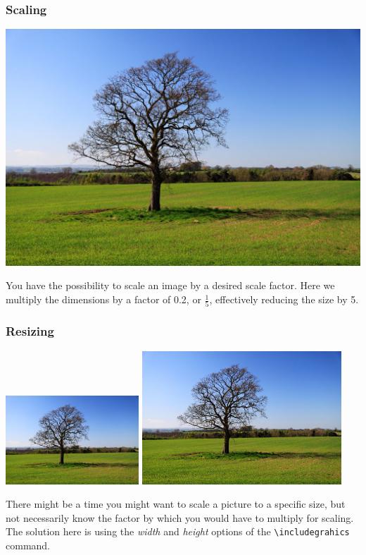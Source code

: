 \documentclass[a4paper]{article}
\begin{document}
\subsubsection{Scaling}
\includegraphics[scale=0.2]{lonely-tree}

You have the possibility to scale an image by a desired scale factor.
Here we multiply the dimensions by a factor of 0.2, or $\frac{1}{5}$,
effectively reducing the size by 5.


\subsubsection{Resizing}
\includegraphics[width=5cm]{lonely-tree}
\includegraphics[height=5cm]{lonely-tree}

There might be a time you might want to scale a picture to a specific size, but
not necessarily know the factor by which you would have to multiply for scaling.
The solution here is using the \textit{width} and \textit{height} options of
the \verb`\includegrahics` command.
\end{document}
